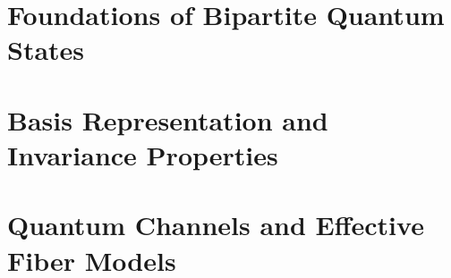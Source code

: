 

\chapter{Foundations of Bipartite Quantum States}
\label{app:bipartite_quantum_states_foundations}






\chapter{Basis Representation and Invariance Properties}
\label{app:basis_representation_and_invariance_properties}


% 


\chapter{Quantum Channels and Effective Fiber Models}
\label{app:quantum_channels_and_effective_fiber_models}




